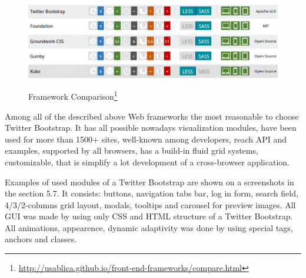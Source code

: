 	\begin{figure}[!ht]
	\centering
	\includegraphics[scale=0.7]{images/Bootstrap&Foundation.png}
	\includegraphics[scale=0.7]{images/Groundwork&Gumby.png} 
	\includegraphics[scale=0.7]{images/Kube.png}  
	\caption[Framework Comparison]{Framework Comparison\footnote{\url{http://usablica.github.io/front-end-frameworks/compare.html}}}
	\label{img:Bootstrap&Foundation.png}
	\label{img:Groundwork&Gumby.png}   
	\label{img:Kube.png}                          
	\end{figure}

 Among all of the described above Web frameworks the most reasonable to choose Twitter Bootstrap. It has all possible nowadays visualization modules, have been used for more than 1500+ sites, well-known among developers, reach API and examples, supported by all browsers, has a build-in fluid grid systems, customizable, that is simplify a lot development of a cross-browser application.

 Examples of used modules of a Twitter Bootstrap are shown on a screenshots in the section 5.7. It consists: buttons, navigation tabs bar, log in form, search field, 4/3/2-columns  grid layout, modals, tooltips and carousel for preview images. All GUI was made by using only CSS and HTML structure of a Twitter Bootstrap. All animations, appearence, dynamic adaptivity was done by using special tags, anchors and classes. 

